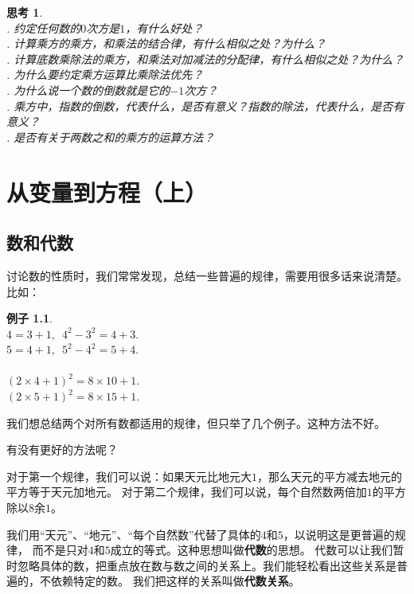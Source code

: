 \documentclass[12pt,UTF8]{ctexbook}
\theoremstyle{definition}
\newtheorem{ex}{例子}[section]
\theoremstyle{plain}
\newtheorem{sk}{思考}[section]
\begin{document}
\begin{sk}\label{sk:0-2-0}
    \mbox{}\\
    . 约定任何数的$0$次方是$1$，有什么好处？\\
    . 计算乘方的乘方，和乘法的结合律，有什么相似之处？为什么？\\
    . 计算底数乘除法的乘方，和乘法对加减法的分配律，有什么相似之处？为什么？\\
    . 为什么要约定乘方运算比乘除法优先？\\
    . 为什么说一个数的倒数就是它的$-1$次方？\\
    . 乘方中，指数的倒数，代表什么，是否有意义？指数的除法，代表什么，是否有意义？\\
    . 是否有关于两数之和的乘方的运算方法？
\end{sk}

\chapter{从变量到方程（上）}

\section{数和代数}
讨论数的性质时，我们常常发现，总结一些普遍的规律，需要用很多话来说清楚。比如：
\begin{ex}\label{ex:1-0-0}
    \mbox{} \\ 
    \indent $4 = 3 + 1,\,\,\, 4^2 - 3^2 = 4 + 3.$ \\
    \indent $5 = 4 + 1, \,\,\,5^2 - 4^2 = 5 + 4.$\\
    \mbox{}\\
    \indent $(2 \times 4 + 1)^2 = 8 \times 10 + 1.$\\
    \indent $(2 \times 5 + 1)^2 = 8 \times 15 + 1.$
\end{ex}
我们想总结两个对所有数都适用的规律，但只举了几个例子。这种方法不好。

有没有更好的方法呢？

对于第一个规律，我们可以说：如果天元比地元大$1$，那么天元的平方减去地元的平方等于天元加地元。
对于第二个规律，我们可以说，每个自然数两倍加$1$的平方除以$8$余$1$。

我们用“天元”、“地元”、“每个自然数”代替了具体的$4$和$5$，以说明这是更普遍的规律，
而不是只对$4$和$5$成立的等式。这种思想叫做\textbf{代数}的思想。
代数可以让我们暂时忽略具体的数，把重点放在数与数之间的关系上。我们能轻松看出这些关系是普遍的，不依赖特定的数。
我们把这样的关系叫做\textbf{代数关系}。
\end{document}
